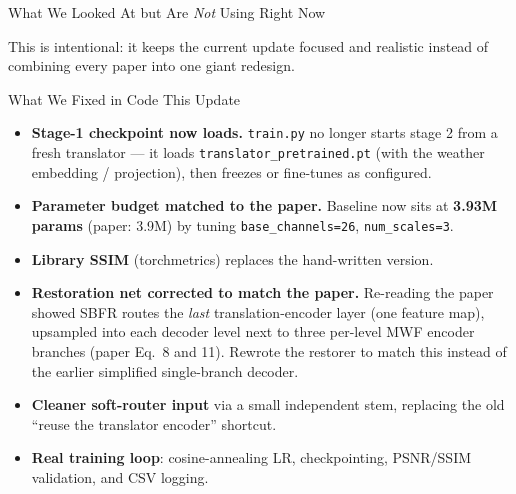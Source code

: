 \documentclass[11pt]{beamer}
\begin{document}
\begin{frame}{What We Looked At but Are \emph{Not} Using Right Now}
\begin{center}
\end{center}
\vspace{4mm}
This is intentional: it keeps the current update focused and realistic instead of
combining every paper into one giant redesign.
\end{frame}

\begin{frame}{What We Fixed in Code This Update}
\begin{itemize}
  \item \textbf{Stage-1 checkpoint now loads.} \texttt{train.py} no longer starts
  stage 2 from a fresh translator --- it loads \texttt{translator\_pretrained.pt}
  (with the weather embedding / projection), then freezes or fine-tunes as configured.
  \item \textbf{Parameter budget matched to the paper.} Baseline now sits at
  \textbf{3.93M params} (paper: 3.9M) by tuning \texttt{base\_channels=26},
  \texttt{num\_scales=3}.
  \item \textbf{Library SSIM} (torchmetrics) replaces the hand-written version.
  \item \textbf{Restoration net corrected to match the paper.} Re-reading the paper
  showed SBFR routes the \emph{last} translation-encoder layer (one feature map),
  upsampled into each decoder level next to three per-level MWF encoder branches
  (paper Eq.~8 and 11). Rewrote the restorer to match this instead of the earlier
  simplified single-branch decoder.
  \item \textbf{Cleaner soft-router input} via a small independent stem, replacing
  the old ``reuse the translator encoder'' shortcut.
  \item \textbf{Real training loop}: cosine-annealing LR, checkpointing, PSNR/SSIM
  validation, and CSV logging.
\end{itemize}
\end{frame}
\end{document}
